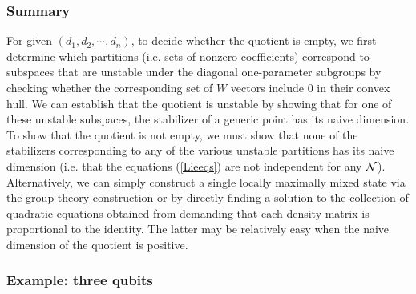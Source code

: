 \documentclass[12pt]{article}
\theoremstyle{definition}
\begin{document}
\subsubsection*{Summary}
For given $(d_1,d_2, \cdots, d_n)$, to decide whether the quotient is empty, we first determine which partitions (i.e. sets of nonzero coefficients) correspond to subspaces that are unstable under the diagonal one-parameter subgroups by checking whether the corresponding set of $W$ vectors include 0 in their convex hull. We can establish that the quotient is unstable by showing that for one of these unstable subspaces, the stabilizer of a generic point has its naive dimension. To show that the quotient is not empty, we must show that none of the stabilizers corresponding to any of the various unstable partitions has its naive dimension (i.e. that the equations (\ref{Lieeqs}) are not independent for any ${\cal N}$). Alternatively, we can simply construct a single locally maximally mixed state via the group theory construction or by directly finding a solution to the collection of quadratic equations obtained from demanding that each density matrix is proportional to the identity. The latter may be relatively easy when the naive dimension of the quotient is positive.


\subsubsection*{Example: three qubits}
\end{document}
